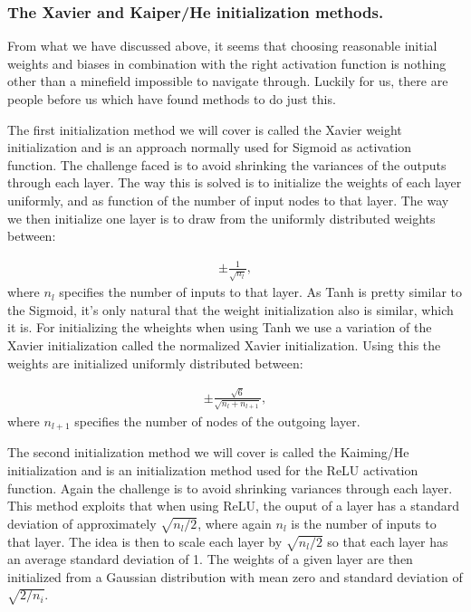 \documentclass[a4paper, UKenglish, 11pt]{uiomaster}
\begin{document}
\subsubsection*{The Xavier and Kaiper/He initialization methods.}

From what we have discussed above, it seems that choosing reasonable initial weights and biases in combination with the right activation function is nothing other than a minefield impossible to navigate through. Luckily for us, there are people before us which have found methods to do just this.

The first initialization method we will cover is called the Xavier weight initialization and is an approach normally used for Sigmoid as activation function. The challenge faced is to avoid shrinking the variances of the outputs through each layer. The way this is solved is to initialize the weights of each layer uniformly, and as function of the number of input nodes to that layer. The way we then initialize one layer is to draw from the uniformly distributed weights between:

\begin{align}
    \pm \frac{1}{\sqrt{n_l}},
\end{align}
where $n_l$ specifies the number of inputs to that layer. As Tanh is pretty similar to the Sigmoid, it's only natural that the weight initialization also is similar, which it is. For initializing the wheights when using Tanh we use a variation of the Xavier initialization called the normalized Xavier initialization. Using this the weights are initialized uniformly distributed between:

\begin{align}
    \pm \frac{\sqrt{6}}{\sqrt{n_l+n_{l+1}}},
\end{align}
where $n_{l+1}$ specifies the number of nodes of the outgoing layer.

The second initialization method we will cover is called the Kaiming/He initialization and is an initialization method used for the ReLU activation function. Again the challenge is to avoid shrinking variances through each layer. This method exploits that when using ReLU, the ouput of a layer has a standard deviation of approximately $\sqrt{n_l/2}$, where again $n_l$ is the number of inputs to that layer. The idea is then to scale each layer by $\sqrt{n_l/2}$ so that each layer has an average standard deviation of 1. The weights of a given layer are then initialized from a Gaussian distribution with mean zero and standard deviation of $\sqrt{2/n_i}$.
\end{document}
